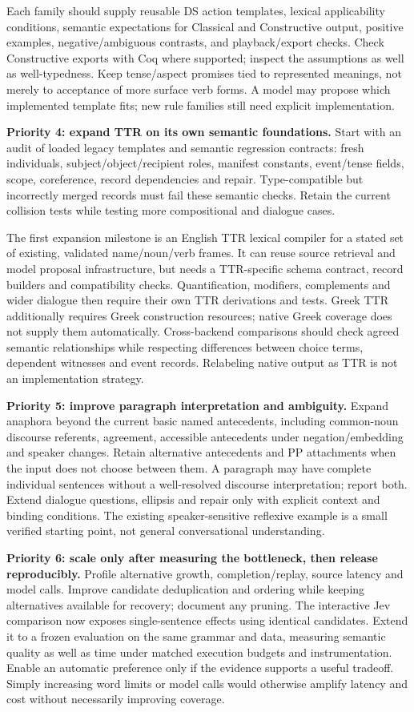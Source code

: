 \documentclass[11pt,a4paper]{article}
\begin{document}
Each family should supply reusable DS action templates, lexical
applicability conditions, semantic expectations for Classical and
Constructive output, positive examples, negative/ambiguous contrasts,
and playback/export checks. Check Constructive exports with Coq where
supported; inspect the assumptions as well as well-typedness. Keep
tense/aspect promises tied to represented meanings, not merely to
acceptance of more surface verb forms. A model may propose which
implemented template fits; new rule families still need explicit
implementation.

\textbf{Priority 4: expand TTR on its own semantic foundations.} Start
with an audit of loaded legacy templates and semantic regression
contracts: fresh individuals, subject/object/recipient roles, manifest
constants, event/tense fields, scope, coreference, record dependencies
and repair. Type-compatible but incorrectly merged records must fail
these semantic checks. Retain the current collision tests while testing
more compositional and dialogue cases.

The first expansion milestone is an English TTR lexical compiler for a
stated set of existing, validated name/noun/verb frames. It can reuse
source retrieval and model proposal infrastructure, but needs a
TTR-specific schema contract, record builders and compatibility checks.
Quantification, modifiers, complements and wider dialogue then require
their own TTR derivations and tests. Greek TTR additionally requires
Greek construction resources; native Greek coverage does not supply them
automatically. Cross-backend comparisons should check agreed semantic
relationships while respecting differences between choice terms,
dependent witnesses and event records. Relabeling native output as TTR
is not an implementation strategy.

\textbf{Priority 5: improve paragraph interpretation and ambiguity.}
Expand anaphora beyond the current basic named antecedents, including
common-noun discourse referents, agreement, accessible antecedents under
negation/embedding and speaker changes. Retain alternative antecedents
and PP attachments when the input does not choose between them. A
paragraph may have complete individual sentences without a well-resolved
discourse interpretation; report both. Extend dialogue questions,
ellipsis and repair only with explicit context and binding conditions.
The existing speaker-sensitive reflexive example is a small verified
starting point, not general conversational understanding.

\textbf{Priority 6: scale only after measuring the bottleneck, then
release reproducibly.} Profile alternative growth, completion/replay,
source latency and model calls. Improve candidate deduplication and
ordering while keeping alternatives available for recovery; document any
pruning. The interactive Jev comparison now exposes single-sentence
effects using identical candidates. Extend it to a frozen evaluation on
the same grammar and data, measuring semantic quality as well as time
under matched execution budgets and instrumentation. Enable an automatic
preference only if the evidence supports a useful tradeoff. Simply
increasing word limits or model calls would otherwise amplify latency
and cost without necessarily improving coverage.
\end{document}
